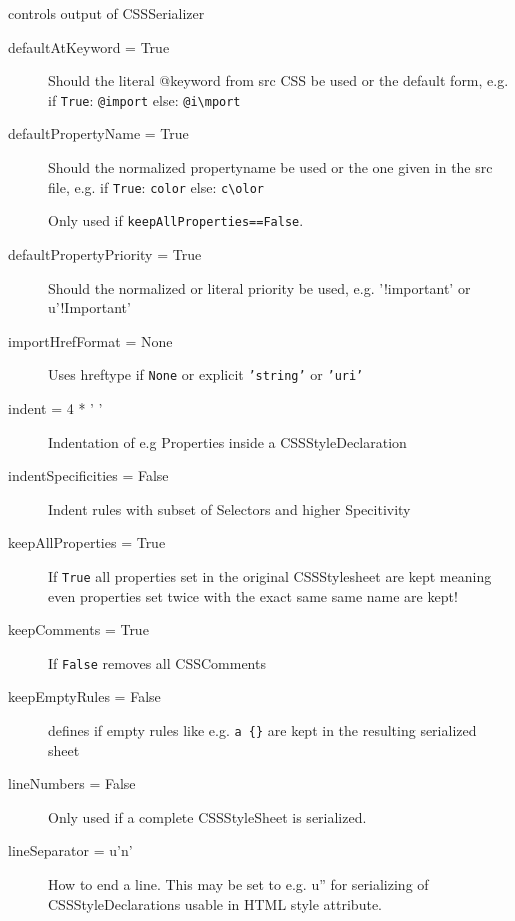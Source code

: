 controls output of CSSSerializer
\begin{description}
\item[{defaultAtKeyword = True}] \leavevmode 
Should the literal @keyword from src CSS be used or the default
form, e.g. if \texttt{True}: \texttt{@import} else: \texttt{@i{\textbackslash}mport}

\item[{defaultPropertyName = True}] \leavevmode 
Should the normalized propertyname be used or the one given in
the src file, e.g. if \texttt{True}: \texttt{color} else: \texttt{c{\textbackslash}olor}

Only used if \texttt{keepAllProperties==False}.

\item[{defaultPropertyPriority = True}] \leavevmode 
Should the normalized or literal priority be used, e.g. '!important'
or u'!Important'

\item[{importHrefFormat = None}] \leavevmode 
Uses hreftype if \texttt{None} or explicit \texttt{'string'} or \texttt{'uri'}

\item[{indent = 4 * ' '}] \leavevmode 
Indentation of e.g Properties inside a CSSStyleDeclaration

\item[{indentSpecificities = False}] \leavevmode 
Indent rules with subset of Selectors and higher Specitivity

\item[{keepAllProperties = True}] \leavevmode 
If \texttt{True} all properties set in the original CSSStylesheet
are kept meaning even properties set twice with the exact same
same name are kept!

\item[{keepComments = True}] \leavevmode 
If \texttt{False} removes all CSSComments

\item[{keepEmptyRules = False}] \leavevmode 
defines if empty rules like e.g. \texttt{a {\{}{\}}} are kept in the resulting
serialized sheet

\item[{lineNumbers = False}] \leavevmode 
Only used if a complete CSSStyleSheet is serialized.

\item[{lineSeparator = u'n'}] \leavevmode 
How to end a line. This may be set to e.g. u'' for serializing of
CSSStyleDeclarations usable in HTML style attribute.


\end{description}
